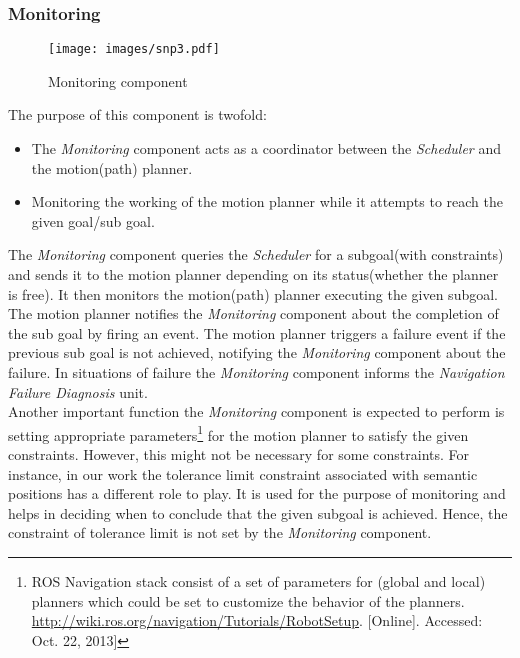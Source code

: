 \subsubsection{Monitoring}
\begin{figure}[htbp] %
   \centering
   \texttt{[image: images/snp3.pdf]}
   \caption{Monitoring component}
   \label{Fig:Data flow summery}
\end{figure}

The purpose of this component is twofold:
  \begin{itemize}
   \item The \textit{Monitoring} component acts as a coordinator between the \textit{Scheduler} and the motion(path) planner.
   \item Monitoring the working of the motion planner while it attempts to reach the given goal/sub goal.
\end{itemize}
The \textit{Monitoring} component queries the \textit{Scheduler} for a subgoal(with constraints) and 
sends it to the motion planner depending on its status(whether the planner is free).
It then monitors the motion(path) planner executing the given subgoal.
The motion planner notifies the \textit{Monitoring} component about the completion of the sub goal by firing an event.
The motion planner triggers a failure event if the previous sub goal is not achieved, notifying the \textit{Monitoring} component about the failure.
In situations of failure the \textit{Monitoring} component informs the \textit{Navigation Failure Diagnosis} unit.\\

Another important function the \textit{Monitoring} component is expected to perform is setting appropriate parameters\footnote[6]{ROS Navigation stack consist of a set of parameters for (global and local) planners which could be set to customize the behavior of the planners. \url{http://wiki.ros.org/navigation/Tutorials/RobotSetup}. [Online]. Accessed: Oct. 22, 2013] } 
for the motion planner to satisfy the given constraints. 
However, this might not be necessary for some constraints.
For instance, in our work the tolerance limit constraint associated with semantic positions has a different role to play.
It is used for the purpose of monitoring and helps in deciding when to conclude that the given subgoal is achieved.
Hence, the constraint of tolerance limit is not set by the \textit{Monitoring} component.

